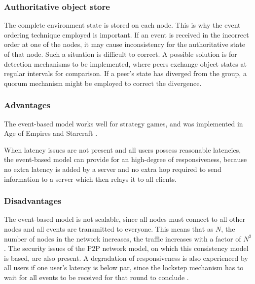 \subsubsection{Authoritative object store}

The complete environment state is stored on each node. This is why the event ordering technique employed is important. If an event is received in the incorrect order at one of the nodes, it may cause inconsistency for the authoritative state of that node. Such a situation is difficult to correct. A possible solution is for detection mechanisms to be implemented, where peers exchange object states at regular intervals for comparison. If a peer's state has diverged from the group, a quorum mechanism might be employed to correct the divergence.

\subsubsection{Advantages}
The event-based model works well for strategy games, and was implemented in Age of Empires \cite{p2p_cm_aoe} and Starcraft \cite{starcraft_network_model}.

When latency issues are not present and all users possess reasonable latencies, the event-based model can provide for an high-degree of responsiveness, because no extra latency is added by a server and no extra hop required to send information to a server which then relays it to all clients.

\subsubsection{Disadvantages}
The event-based model is not scalable, since all nodes must connect to all other nodes and all events are transmitted to
everyone. This means that as $N$, the number of nodes in the network increases, the traffic increases with a factor of $N^2$. The security issues of the P2P network model, on which this consistency model is based, are also present. A degradation of responsiveness is also experienced by all users if one user's latency is below par, since the lockstep mechanism has to wait for all events to be received for that round to conclude \cite{cheat_proof_event_ordering}.

